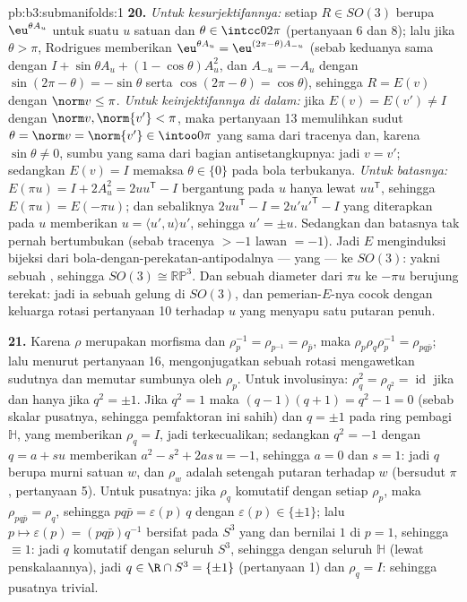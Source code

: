 \begin{solution}{pb:b3:submanifolds:1}
\textbf{20.} \emph{Untuk kesurjektifannya:} setiap $R \in SO(3)$ berupa
$\eu^{\theta A_u}$ untuk suatu $u$ satuan dan $\theta \in
\intcc0{2\pi}$ (pertanyaan 6 dan 8); lalu jika $\theta > \pi$,
Rodrigues memberikan $\eu^{\theta A_u} = \eu^{(2\pi -
\theta)A_{-u}}$ (sebab keduanya sama dengan $I + \sin\theta A_u + (1 -
\cos\theta)A_u^2$, dan $A_{-u} = -A_u$ dengan $\sin(2\pi -
\theta) = -\sin\theta$ serta $\cos(2\pi - \theta) =
\cos\theta$), sehingga $R = E(v)$ dengan $\norm v \leq \pi$.
\emph{Untuk keinjektifannya di dalam:} jika $E(v) = E(v') \neq I$ dengan
$\norm v, \norm{v'} < \pi$, maka pertanyaan 13 memulihkan sudut
$\theta = \norm v = \norm{v'} \in \intoo0\pi$ yang sama dari
tracenya dan, karena $\sin\theta \neq 0$, sumbu yang sama
dari bagian antisetangkupnya: jadi $v = v'$; sedangkan $E(v) = I$
memaksa $\theta \in \{0\}$ pada bola terbukanya. \emph{Untuk batasnya:}
$E(\pi u) = I + 2A_u^2 = 2uu^{\mathsf T} - I$ bergantung pada
$u$ hanya lewat $uu^{\mathsf T}$, sehingga $E(\pi u) =
E(-\pi u)$; dan sebaliknya $2uu^{\mathsf T} - I =
2u'u'^{\mathsf T} - I$ yang diterapkan pada $u$ memberikan $u = \langle
u', u\rangle u'$, sehingga $u' = \pm u$. Sedangkan  dan batasnya
tak pernah bertumbukan (sebab tracenya $> -1$ lawan $= -1$). Jadi $E$ menginduksi
bijeksi  dari bola-dengan-perekatan-antipodalnya
--- yang  --- ke $SO(3)$: yakni sebuah , sehingga $SO(3)
\cong \mathbb{RP}^3$. Dan sebuah diameter dari $\pi u$ ke $-\pi u$
berujung terekat: jadi ia sebuah gelung di $SO(3)$, dan
pemerian-$E$-nya cocok dengan keluarga rotasi pertanyaan 10
terhadap $u$ yang menyapu satu putaran penuh.

\textbf{21.} Karena $\rho$ merupakan morfisma dan $\rho_p^{-1} =
\rho_{p^{-1}} = \rho_{\bar p}$, maka $\rho_p\rho_q\rho_p^{-1}
= \rho_{pq\bar p}$; lalu menurut pertanyaan 16, mengonjugatkan sebuah rotasi
mengawetkan sudutnya dan memutar sumbunya oleh $\rho_p$.
Untuk involusinya: $\rho_q^2 = \rho_{q^2} = \operatorname{id}$
jika dan hanya jika $q^2 = \pm1$. Jika $q^2 = 1$ maka $(q - 1)(q + 1) = q^2 -
1 = 0$ (sebab skalar pusatnya, sehingga pemfaktoran ini sahih) dan
$q = \pm1$ pada ring pembagi $\mathbb H$, yang memberikan $\rho_q
= I$, jadi terkecualikan; sedangkan $q^2 = -1$ dengan $q = a +
su$ memberikan $a^2 - s^2 + 2as\,u = -1$, sehingga $a = 0$ dan $s = 1$:
jadi $q$ berupa murni satuan $w$, dan $\rho_w$ adalah setengah putaran terhadap
$w$ (bersudut $\pi$, pertanyaan 5). Untuk pusatnya: jika $\rho_q$ komutatif
dengan setiap $\rho_p$, maka $\rho_{pq\bar p} = \rho_q$, sehingga
$pq\bar p = \varepsilon(p)\,q$ dengan $\varepsilon(p) \in
\{\pm1\}$; lalu $p \mapsto \varepsilon(p) = (pq\bar p)q^{-1}$ bersifat
 pada $S^3$ yang  dan bernilai $1$ di $p =
1$, sehingga $\equiv 1$: jadi $q$ komutatif dengan seluruh $S^3$, sehingga
dengan seluruh $\mathbb H$ (lewat penskalaannya), jadi $q \in \R \cap S^3 =
\{\pm1\}$ (pertanyaan 1) dan $\rho_q = I$: sehingga pusatnya
trivial.


\end{solution}
